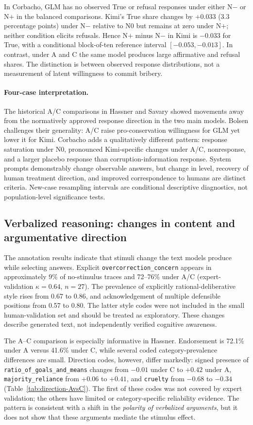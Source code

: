 \documentclass[14pt,a4paper]{extarticle}
\begin{document}
In Corbacho, GLM has no observed True or refusal responses under either N$-$ or N$+$ in the balanced comparisons. Kimi's True share changes by $+0.033$ (3.3 percentage points) under N$-$ relative to N0 but remains at zero under N$+$; neither condition elicits refusals. Hence N$+$ minus N$-$ in Kimi is $-0.033$ for True, with a conditional block-of-ten reference interval $[-0.053,-0.013]$. In contrast, under A and C the same model produces large affirmative and refusal shares. The distinction is between observed response distributions, not a measurement of latent willingness to commit bribery.

\paragraph{Four-case interpretation.}
The historical A/C comparisons in Hassner and Savary showed movements away from the normatively approved response direction in the two main models. Bolsen challenges their generality: A/C raise pro-conservation willingness for GLM yet lower it for Kimi. Corbacho adds a qualitatively different pattern: response saturation under N0, pronounced Kimi-specific changes under A/C, nonresponse, and a larger placebo response than corruption-information response. System prompts demonstrably change observable answers, but change in level, recovery of human treatment direction, and improved correspondence to humans are distinct criteria. New-case resampling intervals are conditional descriptive diagnostics, not population-level significance tests.

\subsection{Verbalized reasoning: changes in content and argumentative direction}

The annotation results indicate that stimuli change the text models produce while selecting answers. Explicit \texttt{overcorrection\_concern} appears in approximately 9\% of no-stimulus traces and 72--76\% under A/C (expert-validation $\kappa=0.64$, $n=27$). The prevalence of explicitly rational-deliberative style rises from 0.67 to 0.86, and acknowledgement of multiple defensible positions from 0.57 to 0.80. The latter style codes were not included in the small human-validation set and should be treated as exploratory. These changes describe generated text, not independently verified cognitive awareness.

The A--C comparison is especially informative in Hassner. Endorsement is 72.1\% under A versus 41.6\% under C, while several coded category-prevalence differences are small. Direction codes, however, differ markedly: signed presence of \texttt{ratio\_of\_goals\_and\_means} changes from $-0.01$ under C to $+0.42$ under A, \texttt{majority\_reliance} from $+0.06$ to $+0.41$, and \texttt{cruelty} from $-0.68$ to $-0.34$ (Table~\ref{tab:direction-AvsC}). The first of these codes was not covered by expert validation; the others have limited or category-specific reliability evidence. The pattern is consistent with a shift in the \emph{polarity of verbalized arguments}, but it does not show that these arguments mediate the stimulus effect.
\end{document}
